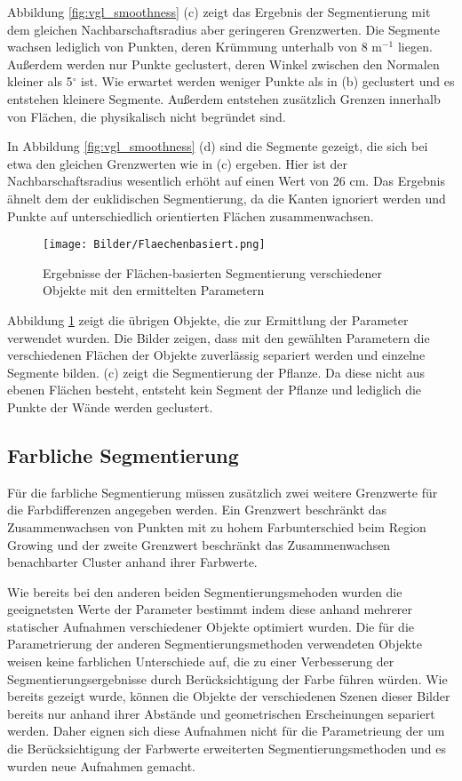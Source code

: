 Abbildung \ref{fig:vgl_smoothness} (c) zeigt das Ergebnis der Segmentierung mit dem gleichen Nachbarschaftsradius aber geringeren Grenzwerten. Die Segmente wachsen lediglich von Punkten, deren Krümmung unterhalb von 8 $ \text{m}^{-1} $ liegen. Außerdem werden nur Punkte geclustert, deren Winkel zwischen den Normalen kleiner als 5$ ^\circ $ ist. Wie erwartet werden weniger Punkte als in (b) geclustert und es entstehen kleinere Segmente. Außerdem entstehen zusätzlich Grenzen innerhalb von Flächen, die physikalisch nicht begründet sind. 

In Abbildung \ref{fig:vgl_smoothness} (d) sind die Segmente gezeigt, die sich bei etwa den gleichen Grenzwerten wie in (c) ergeben. Hier ist der Nachbarschaftsradius wesentlich erhöht auf einen Wert von 26 cm. Das Ergebnis ähnelt dem der euklidischen Segmentierung, da die Kanten ignoriert werden und Punkte auf unterschiedlich orientierten Flächen zusammenwachsen. 

\begin{figure}[hp]
	\centering
	\texttt{[image: Bilder/Flaechenbasiert.png]}
	\caption{Ergebnisse der Flächen-basierten Segmentierung verschiedener Objekte mit den ermittelten Parametern}
	\label{fig:smoothness}
\end{figure}

Abbildung \ref{fig:smoothness} zeigt die übrigen Objekte, die zur Ermittlung der Parameter verwendet wurden. Die Bilder zeigen, dass mit den gewählten Parametern die verschiedenen Flächen der Objekte zuverlässig separiert werden und einzelne Segmente bilden. (c) zeigt die Segmentierung der Pflanze. Da diese nicht aus ebenen Flächen besteht, ent\-steht kein Segment der Pflanze und lediglich die Punkte der Wände werden geclustert.

\subsection[Farbliche Segmentierung (Kopp)]{Farbliche Segmentierung}

Für die farbliche Segmentierung müssen zusätzlich zwei weitere Grenzwerte für die Farbdifferenzen angegeben werden. Ein Grenzwert beschränkt das Zusammenwachsen von Punkten mit zu hohem Farbunterschied beim Region Growing und der zweite Grenzwert beschränkt das Zusammenwachsen benachbarter Cluster anhand ihrer Farbwerte. 

Wie bereits bei den anderen beiden Segmentierungsmehoden wurden die geeignetsten Werte der Parameter bestimmt indem diese anhand mehrerer statischer Aufnahmen verschiedener Objekte optimiert wurden. Die für die Parametrierung der anderen Segmentierungsmethoden verwendeten Objekte weisen keine farblichen Unterschiede auf, die zu einer Verbesserung der Segmentierungsergebnisse durch Berücksichtigung der Farbe führen würden. Wie bereits gezeigt wurde, können die Objekte der verschiedenen Szenen dieser Bilder bereits nur anhand ihrer Abstände und geometrischen Er\-schei\-nung\-en separiert werden. Daher eignen sich diese Aufnahmen nicht für die Parametrieung der um die Berücksichtigung der Farbwerte erweiterten Segmentierungsmethoden und es wurden neue Aufnahmen gemacht. 

